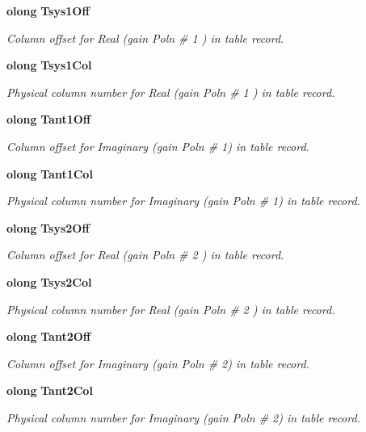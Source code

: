 \begin{CompactItemize}
{\bf olong} {\bf Tsys1Off}
\begin{CompactList}\small\item\em Column offset for Real (gain Poln \# 1 ) in table record. \item\end{CompactList}\item 
{\bf olong} {\bf Tsys1Col}
\begin{CompactList}\small\item\em Physical column number for Real (gain Poln \# 1 ) in table record. \item\end{CompactList}\item 
{\bf olong} {\bf Tant1Off}
\begin{CompactList}\small\item\em Column offset for Imaginary (gain Poln \# 1) in table record. \item\end{CompactList}\item 
{\bf olong} {\bf Tant1Col}
\begin{CompactList}\small\item\em Physical column number for Imaginary (gain Poln \# 1) in table record. \item\end{CompactList}\item 
{\bf olong} {\bf Tsys2Off}
\begin{CompactList}\small\item\em Column offset for Real (gain Poln \# 2 ) in table record. \item\end{CompactList}\item 
{\bf olong} {\bf Tsys2Col}
\begin{CompactList}\small\item\em Physical column number for Real (gain Poln \# 2 ) in table record. \item\end{CompactList}\item 
{\bf olong} {\bf Tant2Off}
\begin{CompactList}\small\item\em Column offset for Imaginary (gain Poln \# 2) in table record. \item\end{CompactList}\item 
{\bf olong} {\bf Tant2Col}
\begin{CompactList}\small\item\em Physical column number for Imaginary (gain Poln \# 2) in table record. \item\end{CompactList}\end{CompactItemize}


